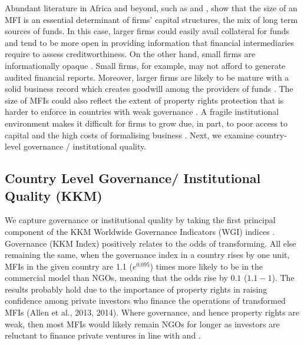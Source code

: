 \documentclass[a4paper,nobind]{templates/ociamthesis}
\begin{document}
Abundant literature in Africa and beyond, such as \textcite{gwatidzo2009corporate} and \textcite{kodongo2015capital}, show that the size of an MFI is an essential determinant of firms' capital structures, the mix of long term sources of funds. In this case, larger firms could easily avail collateral for funds and tend to be more open in providing information that financial intermediaries require to assess creditworthiness. On the other hand, small firms are informationally opaque \autocite{beck2014sme,kersten2017small}. Small firms, for example, may not afford to generate audited financial reports. Moreover, larger firms are likely to be mature with a solid business record which creates goodwill among the providers of funds \autocite{beck2008finance}. The size of MFIs could also reflect the extent of property rights protection that is harder to enforce in countries with weak governance \autocite{johnson2002property,claessens2003financial}. A fragile institutional environment makes it difficult for firms to grow due, in part, to poor access to capital and the high costs of formalising business \autocite{hansen2004reconsidering}. Next, we examine country-level governance / institutional quality.

\hypertarget{country-level-governance-institutional-quality-kkm}{%
\subsection{Country Level Governance/ Institutional Quality (KKM)}\label{country-level-governance-institutional-quality-kkm}}

We capture governance or institutional quality by taking the first principal component of the KKM Worldwide Governance Indicators (WGI) indices \autocite{kraay2010worldwide}. Governance (KKM Index) positively relates to the odds of transforming. All else remaining the same, when the governance index in a country rises by one unit, MFIs in the given country are 1.1 (\(e^{0.095}\)) times more likely to be in the commercial model than NGOs, meaning that the odds rise by \(0.1\) (\(1.1 - 1\)). The results probably hold due to the importance of property rights in raising confidence among private investors who finance the operations of transformed MFIs (Allen et al., 2013, 2014). Where governance, and hence property rights are weak, then most MFIs would likely remain NGOs for longer as investors are reluctant to finance private ventures in line with \textcite{johnson2002property} and \textcite{claessens2003financial}.
\end{document}
